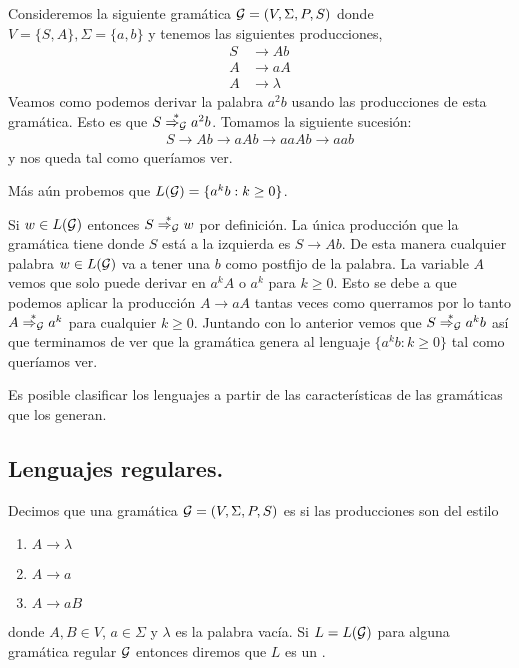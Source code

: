 \documentclass[tesis.tex]{subfiles}
\begin{document}
\medskip
\begin{ej}\label{gramatica-regular}
	Consideremos la siguiente gramática ${\cal G} = (V, \Sigma, P, S)$ donde $V = \{ S, A \}, \Sigma = \{ a,b \}$ y tenemos las siguientes producciones,
	\begin{align*}
	S & \to Ab \\
	A & \to aA \\
	A & \to \lambda
	\end{align*}
	Veamos como podemos derivar la palabra $a^2b$ usando las producciones de esta gramática. 
	Esto es que $S \overset{*}{\Rightarrow_{\cal G}} a^2b$.
	Tomamos la siguiente sucesión:
	\begin{align*}
		S \to Ab \to aAb \to aaAb \to aab
	\end{align*} 
	y nos queda tal como queríamos ver.
	
	Más aún probemos que $L({\cal G}) = \{ a^{k}b : k \ge 0 \}$. 
	
	Si $w \in L(\cal G)$ entonces $S \overset{*}{\Rightarrow_{\cal G}} w$ por definición. 
	La única producción que la gramática tiene donde $S$ está a la izquierda es $S \to Ab$. 
	De esta manera cualquier palabra $w \in L(\cal G)$ va a tener una $b$ como postfijo de la palabra. 
	La variable $A$ vemos que solo puede derivar en $a^{k}A$ o $a^{k}$ para $k \ge 0$.
	Esto se debe a que podemos aplicar la producción $A \to aA$ tantas veces como querramos por lo tanto $A \overset{*}{\Rightarrow_{\cal G}} a^k$ para cualquier $k \ge 0$.
	Juntando con lo anterior vemos que $S \overset{*}{\Rightarrow_{\cal G}} a^{k}b$ así que terminamos de ver que la gramática genera al lenguaje $\{a^kb : k \ge 0\}$ tal como queríamos ver.
\end{ej}



Es posible clasificar los lenguajes a partir de las características de las gramáticas que los generan. 

\subsection{Lenguajes regulares.}

\begin{deff}
	Decimos que una gramática ${\cal G} = (V, \Sigma, P, S)$ es  si las producciones son del estilo
	\begin{enumerate}
		\item $A \to \lambda$
		\item $A \to a$
		\item $A \to a B$
	\end{enumerate}
	donde $A, B \in V$, $a \in \Sigma$ y $\lambda$ es la palabra vacía. 
	Si $L=L({\cal G})$ para alguna gramática regular $\cal G$ entonces diremos que $L$ es un . 
\end{deff}
\end{document}
